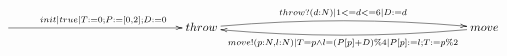 $\xymatrix{
   \ar[rrrrr]^{init | true | T:=0; P:=[0,2]; D:=0} &&&&& {throw} \ar@/^/[rrrrrrr]^{throw?(d:N) | 1 <= d <= 6 | D:=d} &&&&&&& {move} \ar@/^/[lllllll]^{move!(p:N, l:N) | T=p \land l = (P[p] + D)\%4 | P[p]:=l; T:=p\%2}}$